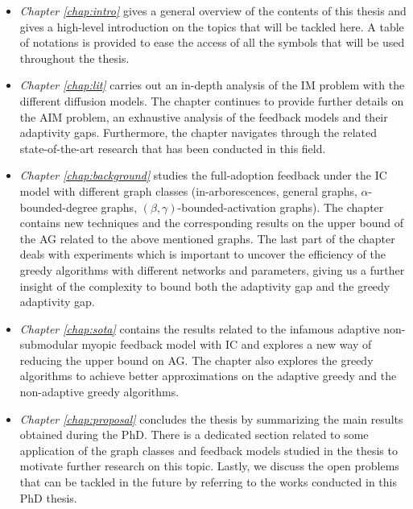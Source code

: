 \begin{itemize}

    \item \textit{Chapter \ref{chap:intro}} gives a general overview of the contents of this thesis and gives a high-level introduction on the topics that will be tackled here. A table of notations is provided to ease the access of all the symbols that will be used throughout the thesis.
    
    \item \textit{Chapter \ref{chap:lit}} carries out an in-depth analysis of the IM problem with the different diffusion models. The chapter continues to provide further details on the AIM problem, an exhaustive analysis of the feedback models and their adaptivity gaps. Furthermore, the chapter navigates through the related state-of-the-art research that has been conducted in this field. 
    
    \item \textit{Chapter \ref{chap:background}} studies the full-adoption feedback under the IC model with different graph classes (in-arborescences, general graphs, $\alpha$-bounded-degree graphs, $(\beta,\gamma)$-bounded-activation graphs). The chapter contains new techniques and the corresponding results on the upper bound of the AG related to the above mentioned graphs. The last part of the chapter deals with experiments which is important to uncover the efficiency of the greedy algorithms with different networks and parameters, giving us a further insight of the complexity to bound both the adaptivity gap and the greedy adaptivity gap.
    
    \item \textit{Chapter \ref{chap:sota}} contains the results related to the infamous adaptive non-submodular myopic feedback model with IC and explores a new way of reducing the upper bound on AG. The chapter also explores the greedy algorithms to achieve better approximations on the adaptive greedy and the non-adaptive greedy algorithms.
    
    \item \textit{Chapter \ref{chap:proposal}} concludes the thesis by summarizing the main results obtained during the PhD. There is a dedicated section related to some application of the graph classes and feedback models studied in the thesis to motivate further research on this topic. Lastly, we discuss the open problems that can be tackled in the future by referring to the works conducted in this PhD thesis. 
    \end{itemize}

